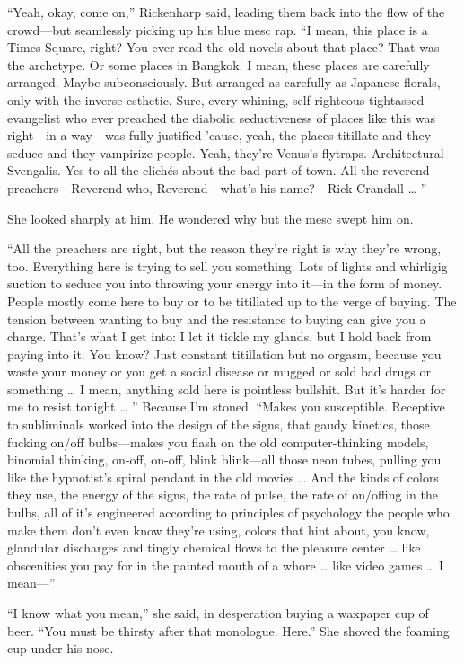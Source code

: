 “Yeah, okay, come on,” Rickenharp said, leading them back into the flow of the crowd—but seamlessly picking up his blue mesc rap. “I mean, this place is a Times Square, right? You ever read the old novels about that place? That was the archetype. Or some places in Bangkok. I mean, these places are carefully arranged. Maybe subconsciously. But arranged as carefully as Japanese florals, only with the inverse esthetic. Sure, every whining, self-righteous tightassed evangelist who ever preached the diabolic seductiveness of places like this was right—in a way—was fully justified ’cause, yeah, the places titillate and they seduce and they vampirize people. Yeah, they’re Venus’s-flytraps. Architectural Svengalis. Yes to all the clichés about the bad part of town. All the reverend preachers—Reverend who, Reverend—what’s his name?—Rick Crandall … ”

She looked sharply at him. He wondered why but the mesc swept him on.

“All the preachers are right, but the reason they’re right is why they’re wrong, too. Everything here is trying to sell you something. Lots of lights and whirligig suction to seduce you into throwing your energy into it—in the form of money. People mostly come here to buy or to be titillated up to the verge of buying. The tension between wanting to buy and the resistance to buying can give you a charge. That’s what I get into: I let it tickle my glands, but I hold back from paying into it. You know? Just constant titillation but no orgasm, because you waste your money or you get a social disease or mugged or sold bad drugs or something … I mean, anything sold here is pointless bullshit. But it’s harder for me to resist tonight … ” Because I’m stoned. “Makes you susceptible. Receptive to subliminals worked into the design of the signs, that gaudy kinetics, those fucking on/off bulbs—makes you flash on the old computer-thinking models, binomial thinking, on-off, on-off, blink blink—all those neon tubes, pulling you like the hypnotist’s spiral pendant in the old movies … And the kinds of colors they use, the energy of the signs, the rate of pulse, the rate of on/offing in the bulbs, all of it’s engineered according to principles of psychology the people who make them don’t even know they’re using, colors that hint about, you know, glandular discharges and tingly chemical flows to the pleasure center … like obscenities you pay for in the painted mouth of a whore … like video games … I mean—”

“I know what you mean,” she said, in desperation buying a waxpaper cup of beer. “You must be thirsty after that monologue. Here.” She shoved the foaming cup under his nose.

